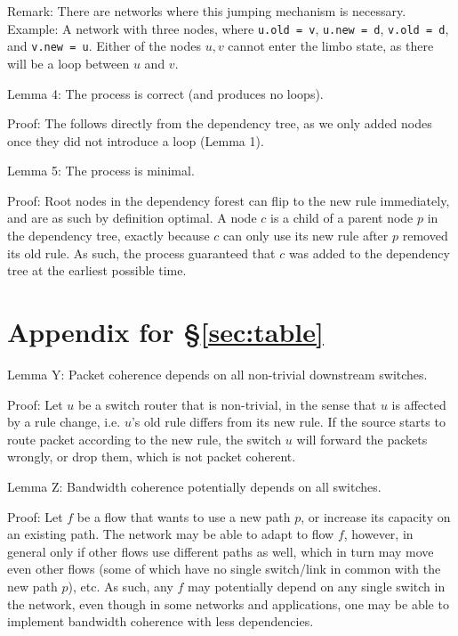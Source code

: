 Remark: There are networks where this jumping mechanism is necessary. Example: A network with three nodes, where \texttt{u.old = v}, \texttt{u.new = d}, \texttt{v.old = d}, and \texttt{v.new = u}. Either of the nodes $u,v$ cannot enter the limbo state, as there will be a loop between $u$ and $v$.

Lemma 4: The process is correct (and produces no loops).

Proof: The follows directly from the dependency tree, as we only added nodes once they did not introduce a loop (Lemma 1).

Lemma 5: The process is minimal.

Proof: Root nodes in the dependency forest can flip to the new rule immediately, and are as such by definition optimal. A node $c$ is a child of a parent node $p$ in the dependency tree, exactly because $c$ can only use its new rule after $p$ removed its old rule. As such, the process guaranteed that $c$ was added to the dependency tree at the earliest possible time.

\section{Appendix for \S\ref{sec:table}}
\label{sec:app2}

Lemma Y: Packet coherence depends on all non-trivial downstream switches.

Proof: Let $u$ be a switch router that is non-trivial, in the sense that $u$ is affected by a rule change, i.e. $u$'s old rule differs from its new rule. If the source starts to route packet according to the new rule, the switch $u$ will forward the packets wrongly, or drop them, which is not packet coherent.

Lemma Z: Bandwidth coherence potentially depends on all switches.

Proof: Let $f$ be a flow that wants to use a new path $p$, or increase its capacity on an existing path. The network may be able to adapt to flow $f$, however, in general only if other flows use different paths as well, which in turn may move even other flows (some of which have no single switch/link in common with the new path $p$), etc. As such, any $f$ may potentially depend on any single switch in the network, even though in some networks and applications, one may be able to implement bandwidth coherence with less dependencies.

